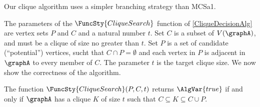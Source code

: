 Our clique algorithm uses a simpler branching strategy than MCSa1.

The parameters of the $\FuncSty{CliqueSearch}$ function of \cref{CliqueDecisionAlg}
are vertex sets $P$ and $C$ and a natural number $t$.  Set $C$ is a subset of
$V(\graphA)$, and must be a clique of size no greater than $t$. Set $P$ is a
set of candidate (``potential'') vertices, sucht that $C \cap P = \emptyset$
and each vertex in $P$ is adjacent in $\graphA$ to every member of $C$.  The
parameter $t$ is the target clique size.  We now show the correctness of the
algorithm.

\begin{proposition}\label{cliqueAlgProp}
    The function $\FuncSty{CliqueSearch}(P,C,t)$ returns $\AlgVar{true}$ if and only if $\graphA$ has a clique
  $K$ of size $t$ such that $C \subseteq K \subseteq C \cup P$.
\end{proposition}
